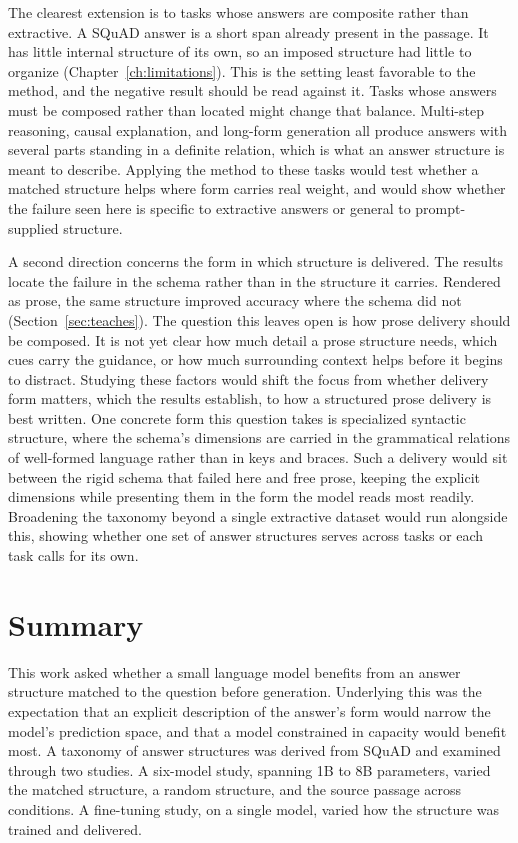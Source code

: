 \documentclass[master]{thesis}
\newcommand{\cref}[1]{Chapter~\ref{#1}}  %
\newcommand{\sref}[1]{Section~\ref{#1}}  %
\begin{document}
The clearest extension is to tasks whose answers are composite rather than extractive. A SQuAD answer is a short span already present in the passage. It has little internal structure of its own, so an imposed structure had little to organize (\cref{ch:limitations}). This is the setting least favorable to the method, and the negative result should be read against it. Tasks whose answers must be composed rather than located might change that balance. Multi-step reasoning, causal explanation, and long-form generation all produce answers with several parts standing in a definite relation, which is what an answer structure is meant to describe. Applying the method to these tasks would test whether a matched structure helps where form carries real weight, and would show whether the failure seen here is specific to extractive answers or general to prompt-supplied structure.

A second direction concerns the form in which structure is delivered. The results locate the failure in the schema rather than in the structure it carries. Rendered as prose, the same structure improved accuracy where the schema did not (\sref{sec:teaches}). The question this leaves open is how prose delivery should be composed. It is not yet clear how much detail a prose structure needs, which cues carry the guidance, or how much surrounding context helps before it begins to distract. Studying these factors would shift the focus from whether delivery form matters, which the results establish, to how a structured prose delivery is best written. One concrete form this question takes is specialized syntactic structure, where the schema's dimensions are carried in the grammatical relations of well-formed language rather than in keys and braces. Such a delivery would sit between the rigid schema that failed here and free prose, keeping the explicit dimensions while presenting them in the form the model reads most readily. Broadening the taxonomy beyond a single extractive dataset would run alongside this, showing whether one set of answer structures serves across tasks or each task calls for its own.

\section{Summary}

This work asked whether a small language model benefits from an answer structure matched to the question before generation. Underlying this was the expectation that an explicit description of the answer's form would narrow the model's prediction space, and that a model constrained in capacity would benefit most. A taxonomy of answer structures was derived from SQuAD and examined through two studies. A six-model study, spanning 1B to 8B parameters, varied the matched structure, a random structure, and the source passage across conditions. A fine-tuning study, on a single model, varied how the structure was trained and delivered.
\end{document}
